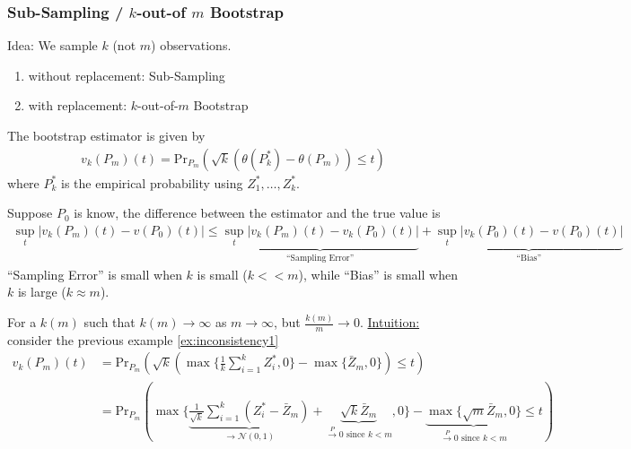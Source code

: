 \documentclass[11pt]{elegantbook}
\begin{document}
\subsubsection*{Sub-Sampling / $k$-out-of $m$ Bootstrap}
Idea: We sample $k$ (not $m$) observations.
\begin{enumerate}[-]
    \item without replacement: Sub-Sampling
    \item with replacement: $k$-out-of-$m$ Bootstrap
\end{enumerate}
The bootstrap estimator is given by
\begin{equation}
    \begin{aligned}
        v_k(P_m)(t)=\text{Pr}_{P_m}\left(\sqrt{k}\left(\theta(P_k^*)-\theta(P_m)\right)\leq t\right)
    \end{aligned}
    \nonumber
\end{equation}
where $P_k^*$ is the empirical probability using $Z_1^*,\ldots,Z_k^*$.

Suppose $P_0$ is know, the difference between the estimator and the true value is
\begin{equation}
    \begin{aligned}
        \sup_t|v_k(P_m)(t)-v(P_0)(t)|\leq
        \underbrace{\sup_t|v_k(P_m)(t)-v_k(P_0)(t)|}_\text{``Sampling Error''}+\underbrace{\sup_t|v_k(P_0)(t)-v(P_0)(t)|}_\text{``Bias''}
    \end{aligned}
    \nonumber
\end{equation}
``Sampling Error'' is small when $k$ is small ($k<<m$), while ``Bias'' is small when $k$ is large ($k\approx m$).

For a $k(m)$ such that $k(m) \rightarrow \infty$ as $m \rightarrow \infty$, but $\frac{k(m)}{m}\rightarrow 0$. \underline{Intuition:} consider the previous example \ref{ex:inconsistency1}
\begin{equation}
    \begin{aligned}
        v_k(P_m)(t)&=\text{Pr}_{P_m}\left(\sqrt{k}\left(\max\{\frac{1}{k}\sum_{i=1}^kZ_i^*,0\}-\max\{\bar{Z}_m,0\}\right)\leq t\right)\\
        &=\text{Pr}_{P_m}\left(\max\{\underbrace{\frac{1}{\sqrt{k}}\sum_{i=1}^k(Z_i^*-\bar{Z}_m)}_{ \rightarrow \mathcal{N}(0,1)}+\underbrace{\sqrt{k}\bar{Z}_m}_{\stackrel{P}{\longrightarrow} 0 \text{ since }k<m},0\}-\underbrace{\max\{\sqrt{m}\bar{Z}_m,0\}}_{\stackrel{P}{\longrightarrow} 0 \text{ since }k<m}\leq t\right)
    \end{aligned}
    \nonumber
\end{equation}
\end{document}
